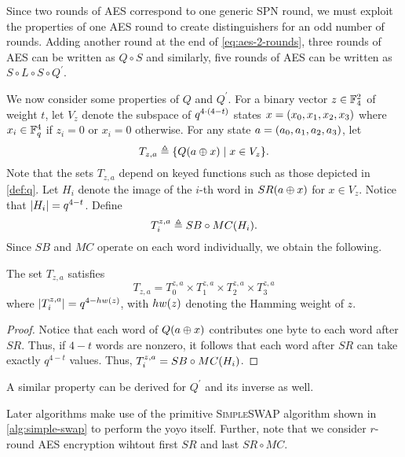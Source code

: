\documentclass[twoside]{article}
\begin{document}
Since two rounds of AES correspond to one generic SPN round, we must exploit the
properties of one AES round to create distinguishers for an odd number of
rounds. Adding another round at the end of \eqref{eq:aes-2-rounds}, three rounds
of AES can be written as \(Q \circ S\) and similarly, five rounds of AES can be
written as \(S \circ L \circ S \circ Q^\prime\).

We now consider some properties of \(Q\) and \(Q^\prime\). For a binary vector
\(z \in \mathbb F_4^2\) of weight \(t\), let \(V_z\) denote the subspace of
\(q^{4\cdot(4 - t)}\) states \(x = (x_0, x_1, x_2, x_3)\) where \(x_i
\in \mathbb F_q^4\) if \(z_i = 0\) or \(x_i = 0\) otherwise. For any state \(a =
(a_0, a_1, a_2, a_3)\), let
\begin{equation}
    T_{z, a} \triangleq \{Q(a \oplus x) \mid x \in V_z\}.
    \label{eq:tza-def}
\end{equation}
Note that the sets \(T_{z, a}\) depend on keyed functions such as those depicted
in \autoref{def:q}. Let \(H_i\) denote the image of the \(i\)-th word in
\(SR(a \oplus x)\) for \(x \in V_z\). Notice that \(\left\vert H_i\right\vert = q^{4 -
t}\). Define
\begin{equation}
    T_i^{z, a} \triangleq SB \circ MC(H_i).
    \label{eq:tiza-def}
\end{equation}
Since \(SB\) and \(MC\) operate on each word individually, we obtain the
following.

\begin{lemma}
    \label{lem:tz-rel}
    The set \(T_{z, a}\) satisfies
    \begin{equation}
        T_{z, a} = T_0^{z, a} \times T_1^{z, a} \times T_2^{z, a} \times T_3^{z, a}
        \label{eq:tz-rel}
    \end{equation}
    where \(\left\vert T_i^{z, a}\right\vert = q^{4 - hw(z)}\), with \(hw(z)\)
    denoting the Hamming weight of \(z\).
\end{lemma}
\begin{proof}
    Notice that each word of \(Q(a \oplus x)\) contributes one byte to each
    word after \(SR\). Thus, if \(4 - t\) words are nonzero, it follows that
    each word after \(SR\) can take exactly \(q^{4 - t}\) values. Thus,
    \(T_i^{z, a} = SB \circ MC(H_i)\).
\end{proof}

A similar property can be derived for \(Q^\prime\) and its inverse as well.

Later algorithms make use of the primitive \textsc{SimpleSWAP} algorithm shown
in \autoref{alg:simple-swap} to perform the yoyo itself. Further, note that we
consider \(r\)-round AES encryption wihtout first \(SR\) and last \(SR \circ
MC\).
\end{document}
